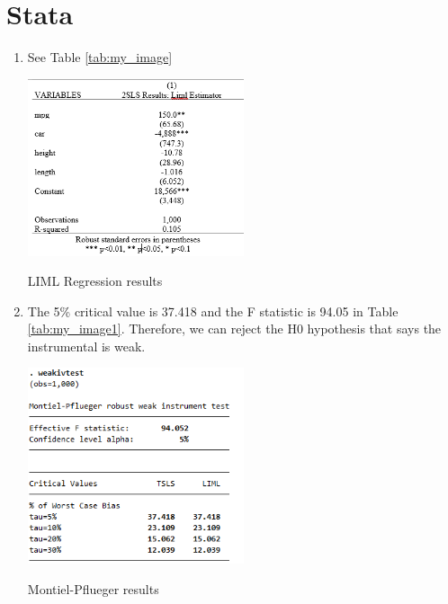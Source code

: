 \documentclass{article}
\begin{document}
\section{Stata}
\begin{enumerate}
\item See Table \ref{tab:my_image}

\begin{table}[h]
    \centering
    \includegraphics[width=0.5\textwidth]{table1.png}
    \caption{LIML Regression results}
    \label{tab:my_image}
\end{table}


\item The 5\% critical value is 37.418 and the F statistic is 94.05 in Table \ref{tab:my_image1}. Therefore, we can reject the H0 hypothesis that says the instrumental is weak.

\begin{table}[h]
    \centering
    \includegraphics[width=0.5\textwidth]{table3 (2).png}
    \caption{Montiel-Pflueger results}
    \label{tab:my_image1}
\end{table}

\end{enumerate}
\end{document}

